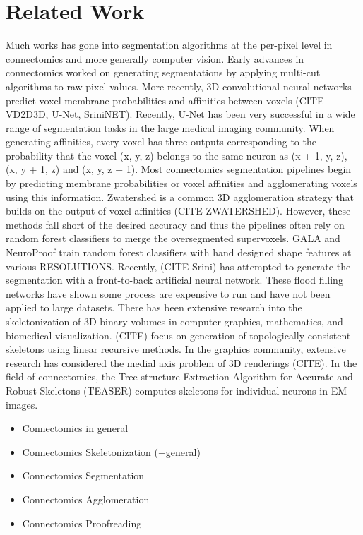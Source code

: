 \section{Related Work}
Much works has gone into segmentation algorithms at the per-pixel level in connectomics and more generally computer vision. Early advances in connectomics worked on generating segmentations by applying multi-cut algorithms to raw pixel values. More recently, 3D convolutional neural networks predict voxel membrane probabilities and affinities between voxels (CITE VD2D3D, U-Net, SriniNET). Recently, U-Net has been very successful in a wide range of segmentation tasks in the large medical imaging community. When generating affinities, every voxel has three outputs corresponding to the probability that the voxel (x, y, z) belongs to the same neuron as (x + 1, y, z), (x, y + 1, z) and (x, y, z + 1). 
Most connectomics segmentation pipelines begin by predicting membrane probabilities or voxel affinities and agglomerating voxels using this information. Zwatershed is a common 3D agglomeration strategy that builds on the output of voxel affinities (CITE ZWATERSHED). However, these methods fall short of the desired accuracy and thus the pipelines often rely on random forest classifiers to merge the oversegmented supervoxels. GALA and NeuroProof train random forest classifiers with hand designed shape features at various RESOLUTIONS.   
Recently, (CITE Srini) has attempted to generate the segmentation with a front-to-back artificial neural network. These flood filling networks have shown some process are expensive to run and have not been applied to large datasets. 
There has been extensive research into the skeletonization of 3D binary volumes in computer graphics, mathematics, and biomedical visualization. (CITE) focus on generation of topologically consistent skeletons using linear recursive methods. In the graphics community, extensive research has considered the medial axis problem of 3D renderings (CITE). In the field of connectomics, the Tree-structure Extraction Algorithm for Accurate and Robust Skeletons (TEASER) computes skeletons for individual neurons in EM images. 





\begin{itemize}
	\item Connectomics in general
	\item Connectomics Skeletonization (+general)
	\item Connectomics Segmentation
	\item Connectomics Agglomeration
	\item Connectomics Proofreading
\end{itemize}
